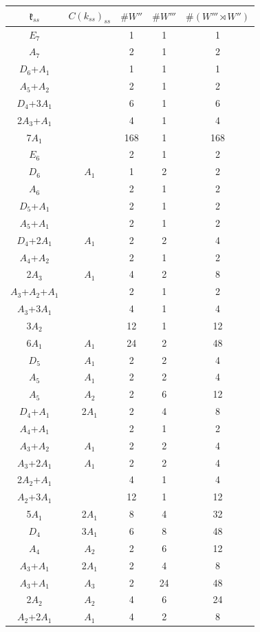 \documentclass[12pt]{report}
\begin{document}
\begin{appendix}
{\begin{tabular}{ccccc}
$\mathfrak{k}_{ss}$& $C(k_{ss})_{ss}$ & $\#W''$ &$\#W'''$&$\#(W'''\rtimes W'')$\\\hline$E_7$ &  & 1 & 1 & 1 \\
$A_7$ &  & 2 & 1 & 2 \\
$D_6$+$A_1$ &  & 1 & 1 & 1 \\
$A_5$+$A_2$ &  & 2 & 1 & 2 \\
$D_4$+3$A_1$ &  & 6 & 1 & 6 \\
2$A_3$+$A_1$ &  & 4 & 1 & 4 \\
7$A_1$ &  & 168 & 1 & 168 \\
$E_6$ &  & 2 & 1 & 2 \\
$D_6$ & $A_1$ & 1 & 2 & 2 \\
$A_6$ &  & 2 & 1 & 2 \\
$D_5$+$A_1$ &  & 2 & 1 & 2 \\
$A_5$+$A_1$ &  & 2 & 1 & 2 \\
$D_4$+2$A_1$ & $A_1$ & 2 & 2 & 4 \\
$A_4$+$A_2$ &  & 2 & 1 & 2 \\
2$A_3$ & $A_1$ & 4 & 2 & 8 \\
$A_3$+$A_2$+$A_1$ &  & 2 & 1 & 2 \\
$A_3$+3$A_1$ &  & 4 & 1 & 4 \\
3$A_2$ &  & 12 & 1 & 12 \\
6$A_1$ & $A_1$ & 24 & 2 & 48 \\
$D_5$ & $A_1$ & 2 & 2 & 4 \\
$A_5$ & $A_1$ & 2 & 2 & 4 \\
$A_5$ & $A_2$ & 2 & 6 & 12 \\
$D_4$+$A_1$ & 2$A_1$ & 2 & 4 & 8 \\
$A_4$+$A_1$ &  & 2 & 1 & 2 \\
$A_3$+$A_2$ & $A_1$ & 2 & 2 & 4 \\
$A_3$+2$A_1$ & $A_1$ & 2 & 2 & 4 \\
2$A_2$+$A_1$ &  & 4 & 1 & 4 \\
$A_2$+3$A_1$ &  & 12 & 1 & 12 \\
5$A_1$ & 2$A_1$ & 8 & 4 & 32 \\
$D_4$ & 3$A_1$ & 6 & 8 & 48 \\
$A_4$ & $A_2$ & 2 & 6 & 12 \\
$A_3$+$A_1$ & 2$A_1$ & 2 & 4 & 8 \\
$A_3$+$A_1$ & $A_3$ & 2 & 24 & 48 \\
2$A_2$ & $A_2$ & 4 & 6 & 24 \\
$A_2$+2$A_1$ & $A_1$ & 4 & 2 & 8 \\

\end{tabular}}
\end{appendix}
\end{document}
